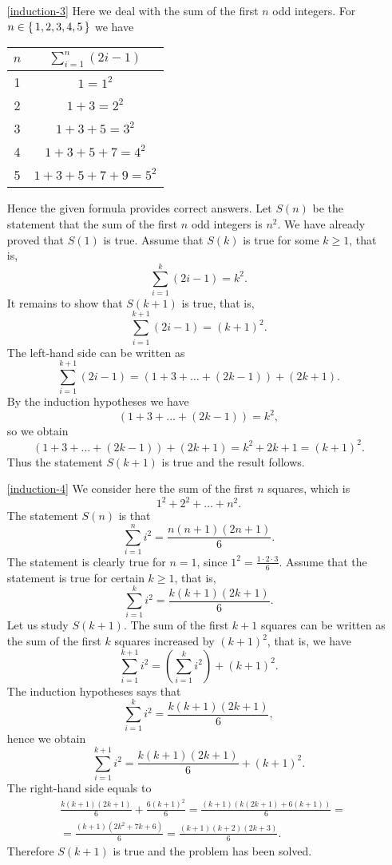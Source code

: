 \begin{enumerate}
\item[\ref{induction-3}] Here we deal with the sum of the first $n$ odd integers. For $n\in\left\{\,1,2,3,4,5\,\right\}$
we have
\begin{center}
\begin{tabular}{|c|c|}
\hline
$n$ & $\sum_{i=1}^n (2i-1)$\\
\hline
1 & $1=1^2$\\
\hline
2 & $1+3=2^2$\\
\hline
3 & $1+3+5=3^2$\\
\hline
4 & $1+3+5+7=4^2$\\
\hline
5 & $1+3+5+7+9=5^2$\\
\hline
\end{tabular}
\end{center}
Hence the given formula provides correct answers. Let $S(n)$ be the statement that the sum of the first $n$
odd integers is $n^2$. We have already proved that $S(1)$ is true. Assume that $S(k)$ is true for some
$k\geq 1$, that is,
$$
\sum_{i=1}^k(2i-1)=k^2.
$$
It remains to show that $S(k+1)$ is true, that is,
$$
\sum_{i=1}^{k+1}(2i-1)=(k+1)^2.
$$
The left-hand side can be written as
$$
\sum_{i=1}^{k+1}(2i-1)=\left(1+3+\ldots+(2k-1)\right)+(2k+1).
$$
By the induction hypotheses we have
$$
\left(1+3+\ldots+(2k-1)\right)=k^2,
$$
so we obtain
$$
\left(1+3+\ldots+(2k-1)\right)+(2k+1)=k^2+2k+1=(k+1)^2.
$$
Thus the statement $S(k+1)$ is true and the result follows.

\item[\ref{induction-4}] We consider here the sum of the first $n$ squares, which is
$$
1^2+2^2+\ldots+n^2.
$$
The statement $S(n)$ is that 
$$
\sum_{i=1}^n i^2=\frac{n(n+1)(2n+1)}{6}.
$$
The statement is clearly true for $n=1$, since $1^2=\frac{1\cdot 2\cdot 3}{6}$. Assume that the statement is true
for certain $k\geq 1$, that is, 
$$
\sum_{i=1}^k i^2=\frac{k(k+1)(2k+1)}{6}.
$$
Let us study $S(k+1)$. The sum of the first $k+1$ squares can be written as the sum of the first $k$ squares increased by $(k+1)^2$,
that is, we have
$$
\sum_{i=1}^{k+1} i^2=\left(\sum_{i=1}^k i^2\right)+(k+1)^2.
$$
The induction hypotheses says that 
$$
\sum_{i=1}^k i^2=\frac{k(k+1)(2k+1)}{6},
$$
hence we obtain
$$
\sum_{i=1}^{k+1} i^2=\frac{k(k+1)(2k+1)}{6}+(k+1)^2.
$$
The right-hand side equals to
\begin{align*}
&\frac{k(k+1)(2k+1)}{6}+\frac{6(k+1)^2}{6}=\frac{(k+1)\left(k(2k+1)+6(k+1)\right)}{6}=\\
&=\frac{(k+1)(2k^2+7k+6)}{6}=\frac{(k+1)(k+2)(2k+3)}{6}.
\end{align*}
Therefore $S(k+1)$ is true and the problem has been solved.


\end{enumerate}
